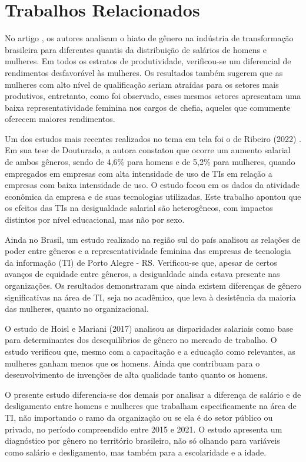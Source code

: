 \section{Trabalhos Relacionados}

No artigo \cite{de2021evidencias}, os autores analisam o hiato de gênero na indústria de transformação brasileira para diferentes quantis da distribuição de salários de homens e mulheres. Em todos os estratos de produtividade, verificou-se um diferencial de rendimentos desfavorável às mulheres.
Os resultados também sugerem que as mulheres com alto nível de
qualificação seriam atraídas para os setores mais produtivos, entretanto, como foi observado, esses mesmos setores apresentam uma baixa representatividade feminina nos cargos de chefia, aqueles que comumente oferecem maiores rendimentos.

Um dos estudos mais recentes realizados no tema em tela foi o de Ribeiro (2022) \cite{ribeiro2022efeitos}. Em sua tese de Douturado, a autora constatou que ocorre um aumento salarial de ambos gêneros,
sendo de 4,6\% para homens e de 5,2\% para mulheres, quando empregados em empresas com
alta intensidade de uso de TIs em relação a empresas com baixa intensidade de uso. O estudo focou em os dados da atividade econômica da empresa e de suas tecnologias utilizadas. Este trabalho apontou que os efeitos das TIs na desigualdade salarial são heterogêneos, com impactos distintos por nível educacional, mas não por sexo. 

Ainda no Brasil, um estudo realizado na região sul do país \cite{camargo2019relaccoes} analisou as relações de poder entre gêneros e a representatividade feminina das empresas de tecnologia da informação (TI) de Porto Alegre - RS. Verificou-se que, apesar de certos avanços de equidade entre gêneros, a desigualdade ainda estava presente nas organizações. Os resultados demonstraram que ainda existem diferenças de gênero significativas na área de TI, seja no acadêmico, que leva à desistência da maioria das mulheres, quanto no organizacional. 

O estudo de Hoisl e Mariani (2017) \cite{hoisl2017sa} analisou as disparidades salariais como base para determinantes dos desequilíbrios de gênero no mercado de trabalho. O estudo verificou que, mesmo com a capacitação e a educação como relevantes, as mulheres ganham menos que os homens. Ainda que contribuam para o desenvolvimento de invenções de alta qualidade tanto quanto os homens.

O presente estudo diferencia-se dos demais por analisar a diferença de salário e de desligamento entre homens e mulheres que trabalham especificamente na área de TI, não importando o ramo da organização ou se ela é do setor público ou privado, no período compreendido entre 2015 e 2021. O estudo apresenta um diagnóstico por gênero no território brasileiro, não só olhando para variáveis como salário e desligamento, mas também para a escolaridade e a idade.
